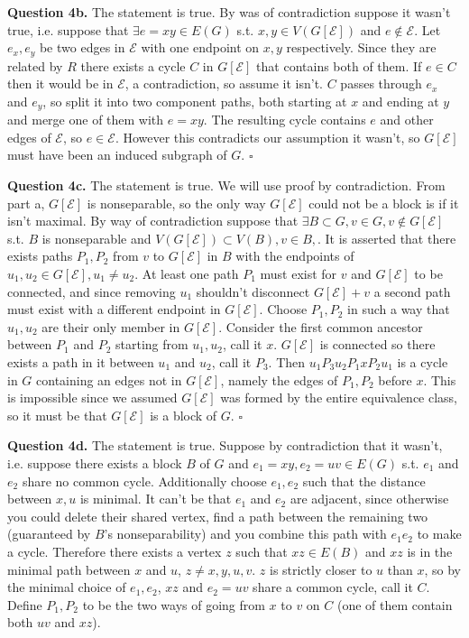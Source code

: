 \documentclass[letterpaper, reqno,11pt]{article}
\begin{document}

{\medskip\noindent\bf Question 4b.} The statement is true. By was of contradiction suppose it wasn't true, i.e. suppose that $\exists e=xy\in E(G)$ s.t. $x,y\in V(G[\mathcal E])$ and $e \not\in \mathcal E$. Let $e_x,e_y$ be two edges in $\mathcal E$ with one endpoint on $x,y$ respectively. Since they are related by $R$ there exists a cycle $C$ in $G[\mathcal E]$ that contains both of them. If $e\in C$ then it would be in $\mathcal E$, a contradiction, so assume it isn't. $C$ passes through $e_x$ and $e_y$, so split it into two component paths, both starting at $x$ and ending at $y$ and merge one of them with $e=xy$. The resulting cycle contains $e$ and other edges of $\mathcal E$, so $e\in \mathcal E$. However this contradicts our assumption it wasn't, so $G[\mathcal E]$ must have been an induced subgraph of $G$. $\square$

{\medskip\noindent\bf Question 4c.} The statement is true. We will use proof by contradiction. From part a, $G[\mathcal E]$ is nonseparable, so the only way $G[\mathcal E]$ could not be a block is if it isn't maximal. By way of contradiction suppose that $\exists B\subset G, v\in G, v\notin G[\mathcal E]$ s.t. $B$ is nonseparable and $V(G[\mathcal E])\subset V(B), v\in B,$. It is asserted that there exists paths $P_1,P_2$ from $v$ to $G[\mathcal E]$ in $B$ with the endpoints of $u_1,u_2\in G[\mathcal E], u_1\neq u_2$. At least one path $P_1$ must exist for $v$ and $G[\mathcal E]$ to be connected, and since removing $u_1$ shouldn't disconnect $G[\mathcal E]+v$ a second path must exist with a different endpoint in $G[\mathcal E]$. Choose $P_1,P_2$ in such a way that $u_1,u_2$ are their only member in $G[\mathcal E]$. Consider the first common ancestor between $P_1$ and $P_2$ starting from $u_1,u_2$, call it $x$. $G[\mathcal E]$ is connected so there exists a path in it between $u_1$ and $u_2$, call it $P_3$. Then $u_1P_3u_2P_1xP_2u_1$ is a cycle in $G$ containing an edges not in $G[\mathcal E]$, namely the edges of $P_1,P_2$ before $x$. This is impossible since we assumed $G[\mathcal E]$ was formed by the entire equivalence class, so it must be that $G[\mathcal E]$ is a block of $G$. $\square$

{\medskip\noindent\bf Question 4d.} The statement is true. Suppose by contradiction that it wasn't, i.e. suppose there exists a block $B$ of $G$ and $e_1=xy, e_2=uv\in E(G)$ s.t. $e_1$ and $e_2$ share no common cycle. Additionally choose $e_1,e_2$ such that the distance between $x,u$ is minimal. It can't be that $e_1$ and $e_2$ are adjacent, since otherwise you could delete their shared vertex, find a path between the remaining two (guaranteed by $B$'s nonseparability) and you combine this path with $e_1e_2$ to make a cycle. Therefore there exists a vertex $z$ such that $xz\in E(B)$ and $xz$ is in the minimal path between $x$ and $u$, $z\neq x,y,u,v$. $z$ is strictly closer to $u$ than $x$, so by the minimal choice of $e_1,e_2$, $xz$ and $e_2=uv$ share a common cycle, call it $C$. Define $P_1,P_2$ to be the two ways of going from $x$ to $v$ on $C$ (one of them contain both $uv$ and $xz$). 
\end{document}
